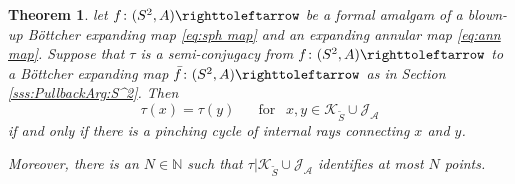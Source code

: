 \documentclass{amsart}
\theoremstyle{plain}
\newtheorem{theorem}{Theorem}[section]
\theoremstyle{definition}
\theoremstyle{remark}
\renewcommand{\AA}{{\mathcal A}}
\newcommand{\blowup}{{\operatorname{blow}}}
\newcommand{\filled}{{\mathcal K}}
\newcommand{\N}{{\mathbb N}}
\newcommand{\reminder}[1]{\textsl{$\lhd\rhd$#1$\lhd\rhd$}\marginpar{$\lhd\rhd\lhd\rhd\lhd\rhd$}}%
\newcommand{\hide}[1]{}
\renewcommand{\sp}{{\ \ }}
\newcommand{\Jul}{{\mathcal J}}
\newcommand\selfmap{\righttoleftarrow}
\begin{document}
\begin{theorem}
\label{thm:Form amalg}
let $f\colon(S^2,A)\selfmap$ be a formal amalgam of a blown-up B\"{o}ttcher expanding map \eqref{eq:sph map} %
and an expanding annular map \eqref{eq:ann map}. %
Suppose that $\tau$ is a semi-conjugacy from  $f\colon(S^2,A)\selfmap$ to a B\"ottcher expanding map $\bar f\colon(S^2,A)\selfmap$ as in Section \ref{sss:PullbackArg:S^2}.  Then \[\tau(x)=\tau(y)\sp\sp\sp\text{ for }\sp x,y\in \filled_{\widetilde S}\cup \Jul_\AA \] if and only if there is a pinching cycle of internal rays connecting $x$ and $y$.

Moreover, there is an $N\in \N$ such that $\tau| \filled_{\widetilde S}\cup \Jul_\AA$ identifies at most $N$ points.
\end{theorem}


\end{document}
